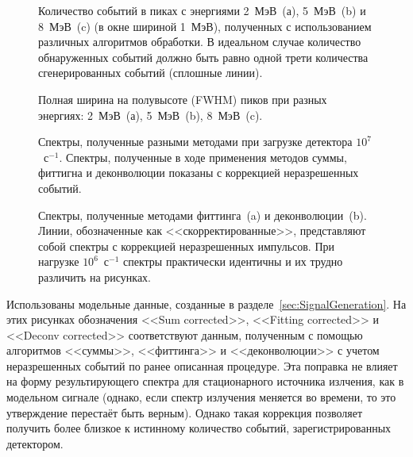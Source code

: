 \begin{figure}[ht!]
  \caption{ Количество событий в пиках с энергиями 2~МэВ~(а), 5~МэВ~(b) и 8~МэВ~(c) (в окне шириной 1~МэВ), полученных с использованием различных алгоритмов обработки. В идеальном случае количество обнаруженных событий должно быть равно одной трети количества сгенерированных событий (сплошные линии).~\cite{Khilkevitch2020} }
  \label{fig:processingByWindowCountRate}
\end{figure}

\begin{figure}[ht!]
  \caption{ Полная ширина на полувысоте (FWHM) пиков при разных энергиях: 2~МэВ~(а), 5~МэВ~(b), 8~МэВ~(c).~\cite{Khilkevitch2020} }
  \label{fig:processingByWindowFwhm}
\end{figure}

\begin{figure}[ht!]
  \caption{ Спектры, полученные разными методами при загрузке детектора $10^7$~с${}^{-1}$. Спектры, полученные в ходе применения методов суммы, фиттигна и деконволюции показаны с коррекцией неразрешенных событий.~\cite{Khilkevitch2020} }
  \label{fig:processingSpectrumCmpByMethods}
\end{figure}

\begin{figure}[ht!]
  \caption{ Спектры, полученные методами фиттинга~(a) и деконволюции~(b). Линии, обозначенные как <<скорректированные>>, представляют собой спектры с коррекцией неразрешенных импульсов. При нагрузке $10^6$~с${}^{-1}$ спектры практически идентичны и их трудно различить на рисунках.~\cite{Khilkevitch2020} }
  \label{fig:processingSpectrumCmpByCountRate}
\end{figure}


Использованы модельные данные, созданные в разделе~\ref{sec:SignalGeneration}. На этих рисунках обозначения <<Sum corrected>>, <<Fitting corrected>> и <<Deconv corrected>> соответствуют данным, полученным с помощью алгоритмов <<суммы>>, <<фиттинга>> и <<деконволюции>> с учетом неразрешенных событий по ранее описанная процедуре. Эта поправка не влияет на форму результирующего спектра для стационарного источника излчения, как в модельном сигнале (однако, если спектр излучения меняется во времени, то это утверждение перестаёт быть верным). Однако такая коррекция позволяет получить более близкое к истинному количество событий, зарегистрированных детектором.


